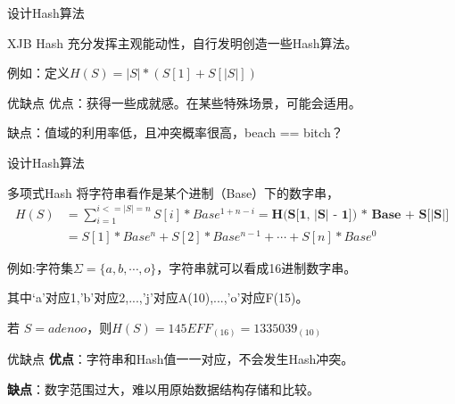 \documentclass{ctexbeamer}		%
\begin{document}
\begin{frame}{设计Hash算法}

\begin{block}{XJB Hash}
充分发挥主观能动性，自行发明创造一些Hash算法。

例如：定义$H(S) = |S| * (S[1] + S[|S|])$
\end{block}
\pause
\begin{block}{优缺点}
优点：获得一些成就感。在某些特殊场景，可能会适用。

缺点：值域的利用率低，且冲突概率很高，beach == bitch？

\end{block}

\end{frame}

\begin{frame}{设计Hash算法}

\begin{block}{多项式Hash}
将字符串看作是某个进制（Base）下的数字串，
\begin{align*}
H(S) &= \sum_{i=1}^{i<=|S| = n}{S[i] * Base^{1 + n - i}} = \textbf{H(S[1, |S| - 1]) * Base + S[|S|]}\\
&= S[1] * Base^n + S[2] * Base^{n-1} + \cdots + S[n] * Base^0
\end{align*}

\pause

例如:字符集$\Sigma = \{a, b, \cdots , o\}$，字符串就可以看成16进制数字串。

其中‘a’对应1,'b'对应2,...,'j'对应A(10),...,'o'对应F(15)。

\pause

若 $S = adenoo$，则$H(S) = 145EFF_{(16)} = 1335039_{(10)}$
\end{block}

\pause
\begin{block}{优缺点}
\textbf{优点}：字符串和Hash值一一对应，不会发生Hash冲突。

\textbf{缺点}：数字范围过大，难以用原始数据结构存储和比较。

\end{block}

\end{frame}
\end{document}
